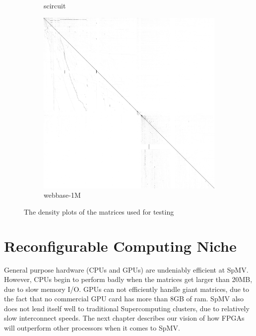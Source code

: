 \begin{figure}
\begin{multicols}{3}
\begin{subfigure}{\linewidth}
\caption{scircuit}
\end{subfigure}
\begin{subfigure}{\linewidth}
\includegraphics[width=\linewidth]{images/webbase-1M}
\caption{webbase-1M}
\end{subfigure}
\end{multicols}
\caption{The density plots of the matrices used for testing}
\end{figure}
\section{Reconfigurable Computing Niche}
General purpose hardware (CPUs and GPUs) are undeniably efficient at SpMV. However, CPUs begin to perform badly when the matrices get larger than 20MB, due to slow memory I/O. GPUs can not efficiently handle giant matrices, due to the fact that no commercial GPU card has more than 8GB of ram. SpMV also does not lend itself well to traditional Supercomputing clusters, due to relatively slow interconnect speeds. The next chapter describes our vision of how FPGAs will outperform other processors when it comes to SpMV.

